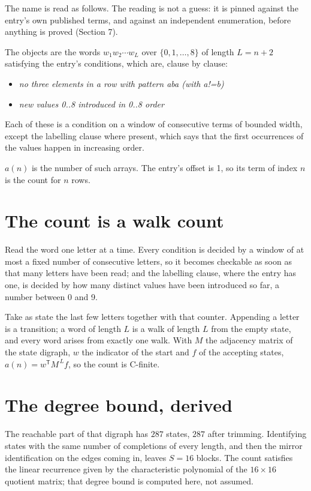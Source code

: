 \documentclass[11pt]{article}
\theoremstyle{definition}
\begin{document}
The name is read as follows. The reading is not a guess: it is pinned against the entry's own published terms, and against an independent enumeration, before anything is proved (Section 7).

The objects are the words $w_1 w_2 \cdots w_L$ over $\{0,1,\dots,8\}$ of length $L = n + 2$ satisfying the entry's conditions, which are, clause by clause:

\begin{itemize}

\item {\itshape no three elements in a row with pattern aba (with a!=b)}

\item {\itshape new values 0..8 introduced in 0..8 order}

\end{itemize}

Each of these is a condition on a window of consecutive terms of bounded width, except the labelling clause where present, which says that the first occurrences of the values happen in increasing order.

$a(n)$ is the number of such arrays. The entry's offset is 1, so its term of index $n$ is the count for $n$ rows.

\section{The count is a walk count}

Read the word one letter at a time. Every condition is decided by a window of at most a fixed number of consecutive letters, so it becomes checkable as soon as that many letters have been read; and the labelling clause, where the entry has one, is decided by how many distinct values have been introduced so far, a number between $0$ and 9.

Take as state the last few letters together with that counter. Appending a letter is a transition; a word of length $L$ is a walk of length $L$ from the empty state, and every word arises from exactly one walk. With $M$ the adjacency matrix of the state digraph, $w$ the indicator of the start and $f$ of the accepting states, $a(n) = w^{\mathsf T}M^{\,L}f$, so the count is C-finite.

\section{The degree bound, derived}

The reachable part of that digraph has $287$ states, $287$ after trimming. Identifying states with the same number of completions of every length, and then the mirror identification on the edges coming in, leaves $S = 16$ blocks. The count satisfies the linear recurrence given by the characteristic polynomial of the $16\times16$ quotient matrix; that degree bound is computed here, not assumed.
\end{document}
